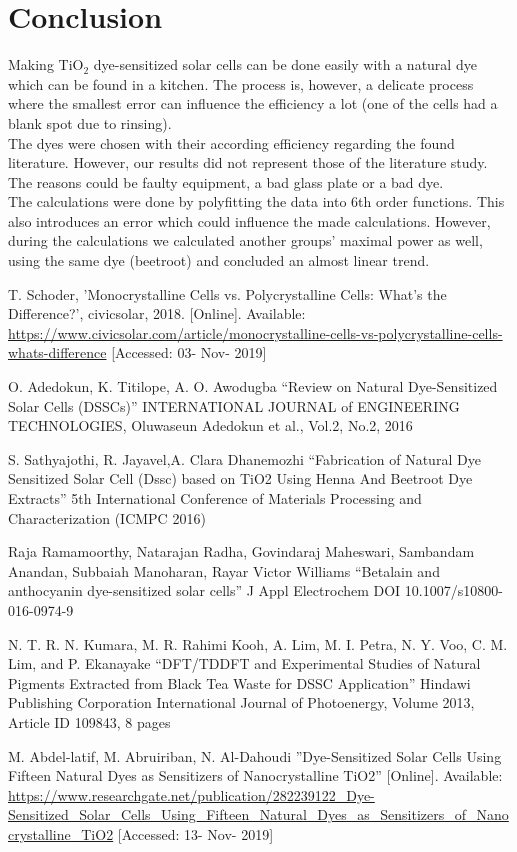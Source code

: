 \documentclass[conference]{IEEEtran}
\begin{document}
\section{Conclusion}
Making TiO$_2$ dye-sensitized solar cells can be done easily with a natural dye which can be found in a kitchen. The process is, however, a delicate process where the smallest error can influence the efficiency a lot (one of the cells had a blank spot due to rinsing).\\
The dyes were chosen with their according efficiency regarding the found literature. However, our results did not represent those of the literature study. The reasons could be faulty equipment, a bad glass plate or a bad dye.\\
The calculations were done by polyfitting the data into 6th order functions. This also introduces an error which could influence the made calculations. However, during the calculations we calculated another groups' maximal power as well, using the same dye (beetroot) and concluded an almost linear trend.


\begin{thebibliography}{00}

 T. Schoder, 'Monocrystalline Cells vs. Polycrystalline Cells: What's the Difference?', civicsolar, 2018. [Online]. Available: \url{https://www.civicsolar.com/article/monocrystalline-cells-vs-polycrystalline-cells-whats-difference} [Accessed: 03- Nov- 2019]

 O. Adedokun, K. Titilope, A. O. Awodugba ``Review on Natural Dye-Sensitized Solar Cells (DSSCs)'' INTERNATIONAL JOURNAL of ENGINEERING TECHNOLOGIES, Oluwaseun Adedokun et al., Vol.2, No.2, 2016

 S. Sathyajothi, R. Jayavel,A. Clara Dhanemozhi ``Fabrication of Natural Dye Sensitized Solar Cell (Dssc) based on TiO2 Using Henna And Beetroot Dye Extracts'' 5th International Conference of Materials Processing and Characterization (ICMPC 2016)

 Raja Ramamoorthy, Natarajan Radha, Govindaraj Maheswari, Sambandam Anandan, Subbaiah Manoharan, Rayar Victor Williams ``Betalain and anthocyanin dye-sensitized solar cells'' J Appl Electrochem
DOI 10.1007/s10800-016-0974-9

 N. T. R. N. Kumara, M. R. Rahimi Kooh, A. Lim,
M. I. Petra, N. Y. Voo, C. M. Lim, and P. Ekanayake ``DFT/TDDFT and Experimental Studies of Natural Pigments Extracted from Black Tea Waste for DSSC Application'' Hindawi Publishing Corporation
International Journal of Photoenergy, Volume 2013, Article ID 109843, 8 pages


 M. Abdel-latif, M. Abruiriban, N. Al-Dahoudi ''Dye-Sensitized Solar Cells Using Fifteen Natural Dyes as Sensitizers of Nanocrystalline TiO2'' [Online]. Available: \url{https://www.researchgate.net/publication/282239122_Dye-Sensitized_Solar_Cells_Using_Fifteen_Natural_Dyes_as_Sensitizers_of_Nanocrystalline_TiO2} [Accessed: 13- Nov- 2019]

\end{thebibliography}
\end{document}
